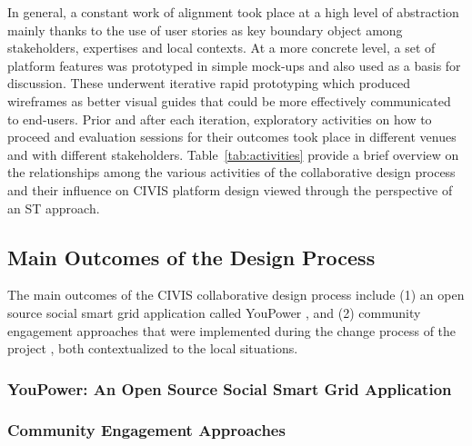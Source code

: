 In general, a constant work of alignment took place at a high level of abstraction mainly thanks to
the use of user stories as key boundary object among stakeholders,
expertises and local contexts.
At a more concrete level, a set of platform features was prototyped in simple mock-ups
and also used as a basis for discussion. These underwent iterative rapid prototyping which
produced wireframes as better visual guides that could be more effectively communicated to end-users.
Prior and after each iteration, exploratory activities on how to proceed and evaluation sessions for their outcomes took place in different venues and with different stakeholders.
Table~\ref{tab:activities}   
provide a brief overview on the relationships among the various activities of the collaborative design process and their influence on CIVIS platform design viewed through the perspective of an ST approach. 

\subsection{Main Outcomes of the Design Process}

The main outcomes of the CIVIS collaborative design process include (1) an open source social smart grid application called YouPower \cite{Huang2017}, and (2) community engagement approaches  that were implemented during the change process of the project \cite{capaccioli_exploring_2017,Hasselqvist2015}, both contextualized to the local situations. 

\subsubsection{YouPower: An Open Source Social Smart Grid Application} %





\subsubsection{Community Engagement Approaches} %

